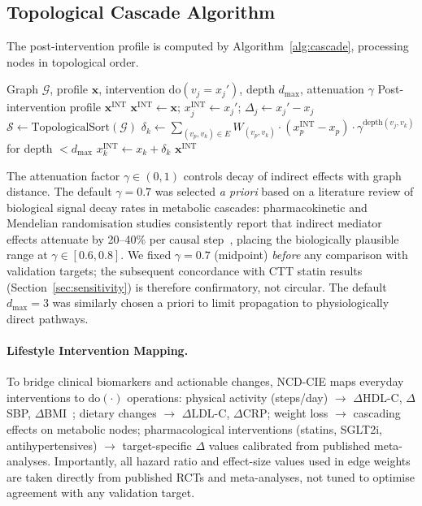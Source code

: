 \documentclass[runningheads]{llncs}
\begin{document}
\subsection{Topological Cascade Algorithm}\label{sec:cascade}

The post-intervention profile is computed by
Algorithm~\ref{alg:cascade}, processing nodes in topological order.

\begin{algorithm}[t]
\caption{Topological Intervention Cascade}
\label{alg:cascade}
\begin{algorithmic}[1]
\REQUIRE Graph $\mathcal{G}$, profile $\mathbf{x}$, intervention
  $\mathrm{do}(v_j = x_j')$, depth $d_{\max}$, attenuation $\gamma$
\ENSURE Post-intervention profile $\mathbf{x}^{\mathrm{INT}}$
\STATE $\mathbf{x}^{\mathrm{INT}} \leftarrow \mathbf{x}$;
  $x_j^{\mathrm{INT}} \leftarrow x_j'$;
  $\Delta_j \leftarrow x_j' - x_j$
\STATE $\mathcal{S} \leftarrow \text{TopologicalSort}(\mathcal{G})$
  \STATE $\delta_k \leftarrow \sum_{(v_p, v_k) \in E} W_{(v_p,v_k)} \cdot (x_p^{\mathrm{INT}} - x_p) \cdot \gamma^{\text{depth}(v_j,v_k)}$ for depth $< d_{\max}$
  \STATE $x_k^{\mathrm{INT}} \leftarrow x_k + \delta_k$
\ENDFOR
\RETURN $\mathbf{x}^{\mathrm{INT}}$
\end{algorithmic}
\end{algorithm}

The attenuation factor $\gamma \in (0,1)$ controls decay of indirect
effects with graph distance.  The default $\gamma = 0.7$ was selected
\emph{a priori} based on a literature review of biological signal
decay rates in metabolic cascades: pharmacokinetic and
Mendelian randomisation studies consistently report that indirect
mediator effects attenuate by 20--40\% per causal
step~\cite{ctt2010,pearl2009causality}, placing the biologically
plausible range at $\gamma \in [0.6, 0.8]$.  We fixed $\gamma = 0.7$
(midpoint) \emph{before} any comparison with validation targets; the
subsequent concordance with CTT statin results
(Section~\ref{sec:sensitivity}) is therefore confirmatory, not
circular.  The default $d_{\max} = 3$ was similarly chosen a priori to
limit propagation to physiologically direct pathways.

\paragraph{Lifestyle Intervention Mapping.}
To bridge clinical biomarkers and actionable changes, NCD-CIE maps
everyday interventions to $\mathrm{do}(\cdot)$ operations: physical
activity (steps/day) $\rightarrow$ $\Delta$HDL-C, $\Delta$SBP,
$\Delta$BMI~\cite{naci2018comparative}; dietary changes $\rightarrow$
$\Delta$LDL-C, $\Delta$CRP; weight loss $\rightarrow$ cascading
effects on metabolic nodes; pharmacological interventions (statins,
SGLT2i, antihypertensives) $\rightarrow$ target-specific $\Delta$
values calibrated from published meta-analyses.  Importantly, all
hazard ratio and effect-size values used in edge weights are taken
directly from published RCTs and meta-analyses, not tuned to optimise
agreement with any validation target.
\end{document}
